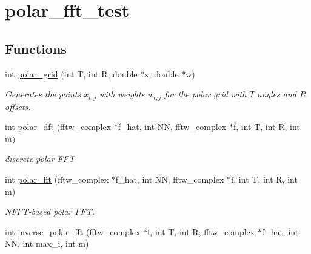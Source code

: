 \hypertarget{group__applications__polarFFT__polar}{
\section{polar\_\-fft\_\-test}
\label{group__applications__polarFFT__polar}
}
\subsection*{Functions}
\begin{CompactItemize}
\item 
int \hyperlink{group__applications__polarFFT__polar_ga0}{polar\_\-grid} (int T, int R, double $\ast$x, double $\ast$w)
\begin{CompactList}\small\item\em Generates the points $x_{t,j}$ with weights $w_{t,j}$ for the polar grid with $T$ angles and $R$ offsets. \item\end{CompactList}\item 
\hypertarget{group__applications__polarFFT__polar_ga1}{
int \hyperlink{group__applications__polarFFT__polar_ga1}{polar\_\-dft} (fftw\_\-complex $\ast$f\_\-hat, int NN, fftw\_\-complex $\ast$f, int T, int R, int m)}
\label{group__applications__polarFFT__polar_ga1}

\begin{CompactList}\small\item\em discrete polar FFT \item\end{CompactList}\item 
\hypertarget{group__applications__polarFFT__polar_ga2}{
int \hyperlink{group__applications__polarFFT__polar_ga2}{polar\_\-fft} (fftw\_\-complex $\ast$f\_\-hat, int NN, fftw\_\-complex $\ast$f, int T, int R, int m)}
\label{group__applications__polarFFT__polar_ga2}

\begin{CompactList}\small\item\em NFFT-based polar FFT. \item\end{CompactList}\item 
\hypertarget{group__applications__polarFFT__polar_ga3}{
int \hyperlink{group__applications__polarFFT__polar_ga3}{inverse\_\-polar\_\-fft} (fftw\_\-complex $\ast$f, int T, int R, fftw\_\-complex $\ast$f\_\-hat, int NN, int max\_\-i, int m)}
\label{group__applications__polarFFT__polar_ga3}


\end{CompactItemize}
